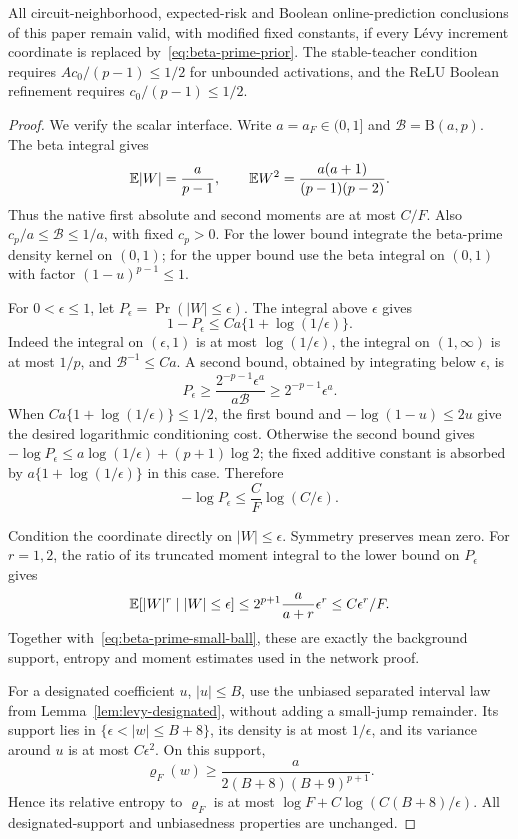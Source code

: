 \begin{proposition}
\label{prop:beta-prime}
All circuit-neighborhood, expected-risk and Boolean online-prediction conclusions of this paper remain valid, with modified fixed constants, if every L\'evy increment coordinate is replaced by~\eqref{eq:beta-prime-prior}. The stable-teacher condition requires $A c_0/(p-1)\le1/2$ for unbounded activations, and the ReLU Boolean refinement requires $c_0/(p-1)\le1/2$.
\end{proposition}
\begin{proof}
We verify the scalar interface. Write $a=a_F\in(0,1]$ and
$\mathcal B=\mathrm B(a,p)$. The beta integral gives
\[
 \mathbb E|W|=\frac{a}{p-1},\qquad
 \mathbb E W^2=\frac{a(a+1)}{(p-1)(p-2)}.
\]
Thus the native first absolute and second moments are at most $C/F$.
Also $c_p/a\le\mathcal B\le1/a$, with fixed $c_p>0$. For the lower bound integrate the beta-prime density kernel on $(0,1)$; for the upper bound use the beta integral on $(0,1)$ with factor $(1-u)^{p-1}\le1$.

For $0<\epsilon\le1$, let $P_\epsilon=\Pr(|W|\le\epsilon)$.
The integral above $\epsilon$ gives
\[
 1-P_\epsilon\le Ca\{1+\log(1/\epsilon)\}.
\]
Indeed the integral on $(\epsilon,1)$ is at most
$\log(1/\epsilon)$, the integral on $(1,\infty)$ is at most $1/p$,
and $\mathcal B^{-1}\le Ca$.
A second bound, obtained by integrating below $\epsilon$, is
\[
 P_\epsilon\ge
 \frac{2^{-p-1}\epsilon^a}{a\mathcal B}
 \ge2^{-p-1}\epsilon^a.
\]
When $Ca\{1+\log(1/\epsilon)\}\le1/2$, the first bound and
$-\log(1-u)\le2u$ give the desired logarithmic conditioning cost.
Otherwise the second bound gives
$-\log P_\epsilon\le a\log(1/\epsilon)+(p+1)\log2$;
the fixed additive constant is absorbed by
$a\{1+\log(1/\epsilon)\}$ in this case. Therefore
\begin{equation}
 -\log P_\epsilon\le\frac C F\log(C/\epsilon).
 \label{eq:beta-prime-small-ball}
\end{equation}

Condition the coordinate directly on $|W|\le\epsilon$.
Symmetry preserves mean zero. For $r=1,2$, the ratio of its truncated moment integral to the lower bound on $P_\epsilon$ gives
\[
 \mathbb E[|W|^r\mid |W|\le\epsilon]
 \le 2^{p+1}\frac{a}{a+r}\epsilon^r
 \le C\epsilon^r/F.
\]
Together with~\eqref{eq:beta-prime-small-ball}, these are exactly the background support, entropy and moment estimates used in the network proof.

For a designated coefficient $u$, $|u|\le B$, use the unbiased separated interval law from Lemma~\ref{lem:levy-designated}, without adding a small-jump remainder. Its support lies in
$\{\epsilon<|w|\le B+8\}$, its density is at most $1/\epsilon$,
and its variance around $u$ is at most $C\epsilon^2$.
On this support,
\[
 \varrho_F(w)\ge
 \frac{a}{2(B+8)(B+9)^{p+1}}.
\]
Hence its relative entropy to $\varrho_F$ is at most
$\log F+C\log(C(B+8)/\epsilon)$.
All designated-support and unbiasedness properties are unchanged.


\end{proof}
